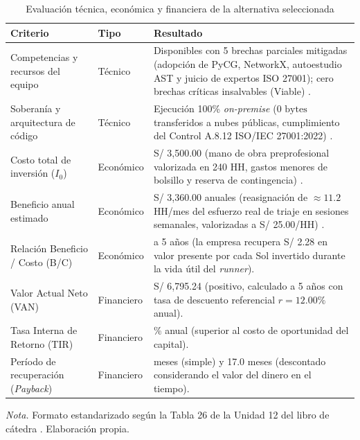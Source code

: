 \begin{table}[H]
\centering
\caption{Evaluación técnica, económica y financiera de la alternativa seleccionada}
\label{tab:evaluacion_integral_u12}
\small
{}
\begin{tabularx}{\textwidth}{>{\raggedright\arraybackslash}p{4.2cm} >{\centering\arraybackslash}p{2.4cm} >{\raggedright\arraybackslash}X}
\toprule
\textbf{Criterio} & \textbf{Tipo} & \textbf{Resultado} \\
\midrule
Competencias y recursos del equipo & Técnico & Disponibles con 5 brechas parciales mitigadas (adopción de PyCG, NetworkX, autoestudio AST y juicio de expertos ISO 27001); cero brechas críticas insalvables (Viable) \parencite{salis2021pycg, hagberg2008exploring}. \\ %
\addlinespace
Soberanía y arquitectura de código & Técnico & Ejecución 100\% \textit{on-premise} ($0\text{ bytes}$ transferidos a nubes públicas, cumplimiento del Control A.8.12 ISO/IEC 27001:2022) \parencite{ladisa2023sok}. \\ %
\addlinespace
Costo total de inversión ($I_0$) & Económico & S/ 3,500.00 (mano de obra preprofesional valorizada en 240 HH, gastos menores de bolsillo y reserva de contingencia) \parencite{torres2026proyecto}. \\ %
\addlinespace
Beneficio anual estimado & Económico & S/ 3,360.00 anuales (reasignación de $\approx 11.2$ HH/mes del esfuerzo real de triaje en sesiones semanales, valorizadas a S/ 25.00/HH) \parencite{pashchenko2022vuln4real}. \\ %
\addlinespace
Relación Beneficio / Costo (B/C) & Económico & 2.28 a 5 años (la empresa recupera S/ 2.28 en valor presente por cada Sol invertido durante la vida útil del \textit{runner}). \\ %
\addlinespace
Valor Actual Neto (VAN) & Financiero & S/ 6,795.24 (positivo, calculado a 5 años con tasa de descuento referencial $r = 12.00\%$ anual). \\ %
\addlinespace
Tasa Interna de Retorno (TIR) & Financiero & 76.9\% anual (superior al costo de oportunidad del capital). \\ %
\addlinespace
Período de recuperación (\textit{Payback}) & Financiero & 14.7 meses (simple) y 17.0 meses (descontado considerando el valor del dinero en el tiempo). \\ %
\bottomrule
\end{tabularx}
\vspace{2pt}
\begin{flushleft}
\scriptsize \textit{Nota.} Formato estandarizado según la Tabla 26 de la Unidad 12 del libro de cátedra \parencite{torres2026proyecto}. Elaboración propia. %
\end{flushleft}
\end{table}

